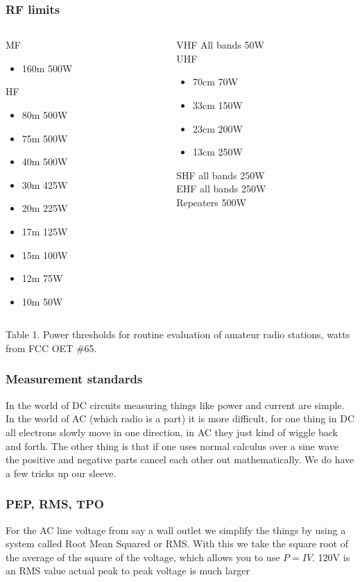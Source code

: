 \documentclass[10pt, handout]{beamer}
\begin{document}
\begin{frame}
\frametitle{RF limits}
\begin{columns}
\begin{column}{.5\textwidth}
MF
\begin{itemize}
\item 160m 500W
\end{itemize}
HF
\begin{itemize}
\item 80m 500W
\item 75m 500W
\item 40m 500W
\item 30m 425W
\item 20m 225W
\item 17m 125W
\item 15m 100W
\item 12m 75W
\item 10m 50W
\end{itemize}
\end{column}
\begin{column}{.5\textwidth}
VHF All bands 50W\\
UHF
\begin{itemize}
\item 70cm 70W
\item 33cm 150W
\item 23cm 200W
\item 13cm 250W
\end{itemize}
SHF all bands 250W\\
EHF all bands 250W\\
Repeaters 500W
\end{column}
\end{columns}
Table 1. Power thresholds for routine evaluation of amateur radio stations, watts from FCC OET \#65.
\end{frame}

\begin{frame}
\frametitle{Measurement standards}
In the world of DC circuits measuring things like power and current are simple. In the world of AC (which radio is a part) it is more difficult, for one thing in DC all electrons slowly move in one direction, in AC they just kind of wiggle back and forth. The other thing is that if one uses normal calculus over a sine wave the positive and negative parts cancel each other out mathematically. We do have a few tricks up our sleeve.
\end{frame}

\begin{frame}
\frametitle{PEP, RMS, TPO}
For the AC line voltage from say a wall outlet we simplify the things by using a system called Root Mean Squared or RMS. With this we take the square root of the average of the square of the voltage, which allows you to use $P=IV$. 120V is an RMS value actual peak to peak voltage is much larger
\end{frame}
\end{document}
